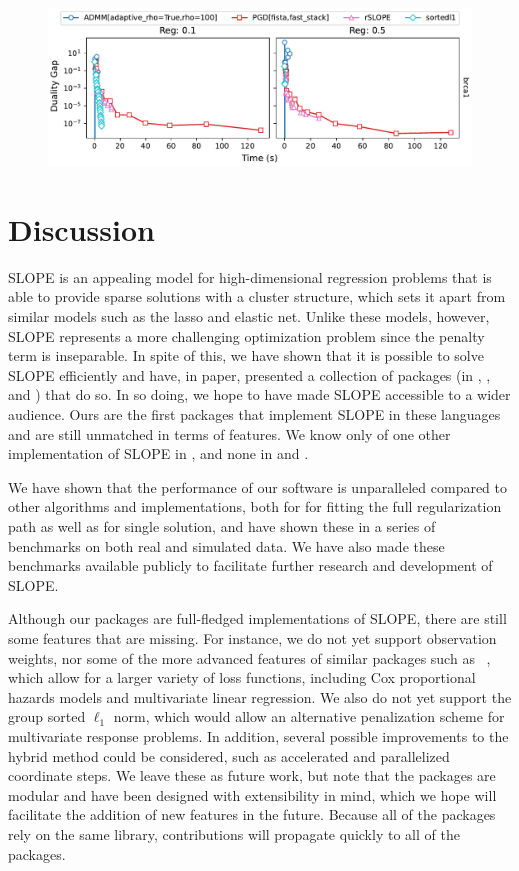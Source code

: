 \documentclass[article]{jss}
\makeatletter
\let\natwidth\Gin@nat@width
\makeatother
\begin{document}
\begin{figure}[htpb]
  \centering
  \includegraphics[width=\natwidth]{images/benchmark_single_real.pdf}
  \caption{%
  }
\end{figure}

\section{Discussion}

SLOPE is an appealing model for high-dimensional regression problems that is
able to provide sparse solutions with a cluster structure, which sets it apart
from similar models such as the lasso and elastic net. Unlike these models,
however, SLOPE represents a more challenging optimization problem since the
penalty term is inseparable. In spite of this, we have shown that it is
possible to solve SLOPE efficiently and have, in paper, presented a collection
of packages (in , , and ) that do
so. In so doing, we hope to have made SLOPE accessible to a wider audience.
Ours are the first packages that implement SLOPE in these languages and
are still unmatched in terms of features. We know only of one other
implementation of SLOPE in , and none in  and
.

We have shown that the performance of our software is unparalleled
compared to other algorithms and implementations, both for for fitting
the full regularization path as well as for single solution, and
have shown these in a series of benchmarks on both real and simulated
data. We have also made these benchmarks available publicly
to facilitate further research and development of SLOPE.

Although our packages are full-fledged implementations of SLOPE, there are
still some features that are missing. For instance, we do not yet support
observation weights, nor some of the more advanced features of similar packages
such as ~\citep{friedman2010}, which allow for a larger variety of
loss functions, including Cox proportional hazards models and multivariate
linear regression. We also do not yet support the group sorted \(\ell_1\) norm,
which would allow an alternative penalization scheme for multivariate response
problems. In addition, several possible improvements to the hybrid method
could be considered, such as accelerated and parallelized coordinate
steps. We leave these as future work, but note that
the packages are modular and have been designed with extensibility in mind,
which we hope will facilitate the addition of new features in the future.
Because all of the packages rely on the same  library, contributions
will propagate quickly to all of the packages.
\end{document}
